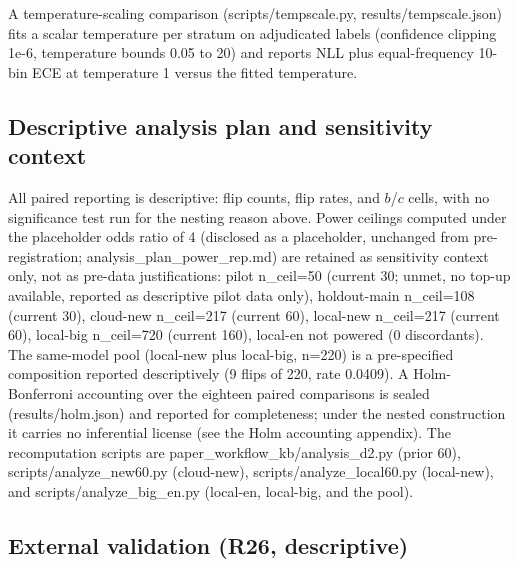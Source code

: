 \documentclass[10pt]{article} %
\begin{document}
A temperature-scaling comparison (scripts/tempscale.py, results/tempscale.json) fits a scalar temperature per stratum on adjudicated labels (confidence clipping 1e-6, temperature bounds 0.05 to 20) and reports NLL plus equal-frequency 10-bin ECE at temperature 1 versus the fitted temperature.

\subsection{Descriptive analysis plan and sensitivity context}

All paired reporting is descriptive: flip counts, flip rates, and $b$/$c$ cells, with no significance test run for the nesting reason above. Power ceilings computed under the placeholder odds ratio of 4 (disclosed as a placeholder, unchanged from pre-registration; analysis\_plan\_power\_rep.md) are retained as sensitivity context only, not as pre-data justifications: pilot n\_ceil=50 (current 30; unmet, no top-up available, reported as descriptive pilot data only), holdout-main n\_ceil=108 (current 30), cloud-new n\_ceil=217 (current 60), local-new n\_ceil=217 (current 60), local-big n\_ceil=720 (current 160), local-en not powered (0 discordants). The same-model pool (local-new plus local-big, n=220) is a pre-specified composition reported descriptively (9 flips of 220, rate 0.0409). A Holm-Bonferroni accounting over the eighteen paired comparisons is sealed (results/holm.json) and reported for completeness; under the nested construction it carries no inferential license (see the Holm accounting appendix). The recomputation scripts are paper\_workflow\_kb/analysis\_d2.py (prior 60), scripts/analyze\_new60.py (cloud-new), scripts/analyze\_local60.py (local-new), and scripts/analyze\_big\_en.py (local-en, local-big, and the pool).

\subsection{External validation (R26, descriptive)}
\end{document}
